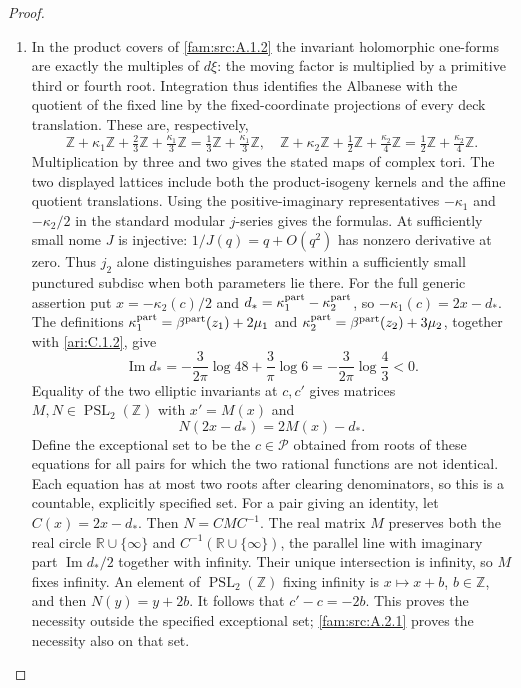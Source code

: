 \begin{proof}
\begin{enumerate}[label=\arabic*.,leftmargin=*]
\item In the product covers of \ref{fam:src:A.1.2} the invariant holomorphic one-forms are exactly the multiples of $d\xi$: the moving factor is multiplied by a primitive third or fourth root. Integration thus identifies the Albanese with the quotient of the fixed line by the fixed-coordinate projections of every deck translation. These are, respectively,
\[
 \mathbb Z+\kappa_1\mathbb Z+\tfrac23\mathbb Z+\tfrac{\kappa_1}3\mathbb Z
   =\tfrac13\mathbb Z+\tfrac{\kappa_1}3\mathbb Z,
\quad
 \mathbb Z+\kappa_2\mathbb Z+\tfrac12\mathbb Z+\tfrac{\kappa_2}4\mathbb Z
   =\tfrac12\mathbb Z+\tfrac{\kappa_2}4\mathbb Z.
\]
Multiplication by three and two gives the stated maps of complex tori. The two displayed lattices include both the product-isogeny kernels and the affine quotient translations. Using the positive-imaginary representatives $-\kappa_1$ and $-\kappa_2/2$ in the standard modular $j$-series gives the formulas. At sufficiently small nome $J$ is injective: $1/J(q)=q+O(q^2)$ has nonzero derivative at zero. Thus $j_2$ alone distinguishes parameters within a sufficiently small punctured subdisc when both parameters lie there. For the full generic assertion put $x=-\kappa_2(c)/2$ and $d_*=\kappa_1^{\rm part}-\kappa_2^{\rm part}$, so $-\kappa_1(c)=2x-d_*$. The definitions $\kappa_1^{\rm part}=\beta^{\rm part}(z_1)+2\mu_1$ and
$\kappa_2^{\rm part}=\beta^{\rm part}(z_2)+3\mu_2$, together with
\cref{ari:C.1.2}, give
\[
 \operatorname{Im}d_*=
 -\frac{3}{2\pi}\log48+\frac3\pi\log6
 =-\frac{3}{2\pi}\log\frac43<0.
\] Equality of the two elliptic invariants at $c,c'$ gives matrices $M,N\in\operatorname{PSL}_2(\mathbb Z)$ with $x'=M(x)$ and
\[
 N(2x-d_*)=2M(x)-d_*.
\]
Define the exceptional set to be the $c\in\mathcal P$ obtained from roots of these equations for all pairs for which the two rational functions are not identical. Each equation has at most two roots after clearing denominators, so this is a countable, explicitly specified set. For a pair giving an identity, let $C(x)=2x-d_*$. Then $N=CMC^{-1}$. The real matrix $M$ preserves both the real circle $\mathbb R\cup\{\infty\}$ and $C^{-1}(\mathbb R\cup\{\infty\})$, the parallel line with imaginary part $\operatorname{Im}d_*/2$ together with infinity. Their unique intersection is infinity, so $M$ fixes infinity. An element of $\operatorname{PSL}_2(\mathbb Z)$ fixing infinity is $x\mapsto x+b$, $b\in\mathbb Z$, and then $N(y)=y+2b$. It follows that $c'-c=-2b$. This proves the necessity outside the specified exceptional set; \ref{fam:src:A.2.1} proves the necessity also on that set.
\end{enumerate}
\end{proof}